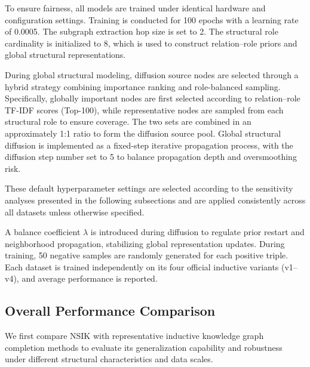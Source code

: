 \documentclass[preprint,12pt]{elsarticle}
\begin{document}
To ensure fairness, all models are trained under identical hardware and configuration settings. Training is conducted for 100 epochs with a learning rate of 0.0005. The subgraph extraction hop size is set to 2. The structural role cardinality is initialized to 8, which is used to construct relation--role priors and global structural representations.

During global structural modeling, diffusion source nodes are selected through a hybrid strategy combining importance ranking and role-balanced sampling. Specifically, globally important nodes are first selected according to relation--role TF-IDF scores (Top-100), while representative nodes are sampled from each structural role to ensure coverage. The two sets are combined in an approximately 1:1 ratio to form the diffusion source pool. Global structural diffusion is implemented as a fixed-step iterative propagation process, with the diffusion step number set to 5 to balance propagation depth and oversmoothing risk.

These default hyperparameter settings are selected according to the sensitivity analyses presented in the following subsections and are applied consistently across all datasets unless otherwise specified.

A balance coefficient $\lambda$ is introduced during diffusion to regulate prior restart and neighborhood propagation, stabilizing global representation updates. During training, 50 negative samples are randomly generated for each positive triple. Each dataset is trained independently on its four official inductive variants (v1--v4), and average performance is reported.


\subsection{Overall Performance Comparison}

We first compare NSIK with representative inductive knowledge graph completion methods to evaluate its generalization capability and robustness under different structural characteristics and data scales.
\end{document}
